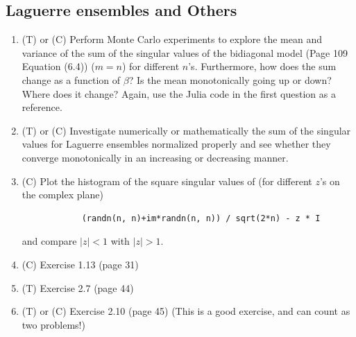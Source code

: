 \documentclass{article}
\begin{document}
\subsection*{Laguerre ensembles and Others}

\begin{enumerate}
    \item (T) or (C) Perform Monte Carlo experiments to explore the mean and variance of the sum of the singular values of the bidiagonal model (Page 109  Equation (6.4)) ($m = n$) for different $n$'s. Furthermore, how does the sum change as a function of $\beta$? Is the mean monotonically going up or down? Where does it change? Again, use the Julia code in the first question as a reference.
    \item (T) or (C) Investigate numerically or mathematically the sum of the singular values for Laguerre ensembles normalized properly and see whether they converge monotonically in an increasing or decreasing manner.
    \item (C) Plot the histogram of the square singular values of (for different $z$'s on the complex plane)
        \begin{verbatim}
            (randn(n, n)+im*randn(n, n)) / sqrt(2*n) - z * I
        \end{verbatim} and compare $|z|<1$ with $|z|>1$.
    \item (C) Exercise 1.13 (page 31)
    \item (T) Exercise 2.7 (page 44)
   \item (T) or (C) Exercise 2.10 (page 45) (This is a good exercise, and can count as two problems!)
   
\end{enumerate}
 
\end{document}

